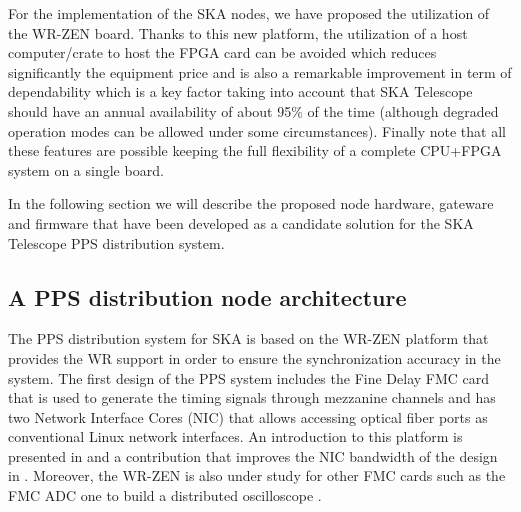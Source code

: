For the implementation of the SKA nodes, we have proposed the utilization of the WR-ZEN board. Thanks to this new platform, the utilization of a host computer/crate to host the FPGA card can be avoided which reduces significantly the equipment price and is also a remarkable improvement in term of dependability which is a key factor taking into account that SKA Telescope should have an annual availability of about 95\% of the time (although degraded operation modes can be allowed under some circumstances).
Finally note that all these features are possible keeping the full flexibility of a complete CPU+FPGA system on a single board. 

In the following section we will describe the proposed node hardware, gateware and firmware that have been developed as a candidate solution for the SKA Telescope PPS distribution system. 

\subsection{A PPS distribution node architecture} \label{subsec:ska-pps-system-arch}


The PPS distribution system for SKA is based on the WR-ZEN platform that provides the WR support in order to ensure the synchronization accuracy in the system. The first design of the PPS system includes the Fine Delay FMC card that is used to generate the timing signals through mezzanine channels and has two Network Interface Cores (NIC) that allows accessing optical fiber ports as conventional Linux network interfaces. An introduction to this platform is presented in \cite{migueljl-paper-wr-zen-intro} and a contribution that improves the NIC bandwidth of the design in \cite{jorgesg-paper-wr-zen-dma}. Moreover, the WR-ZEN is also under study for other FMC cards such as the FMC ADC one to build a distributed oscilloscope \cite{joselj-paper-wr-zen-adc}.

